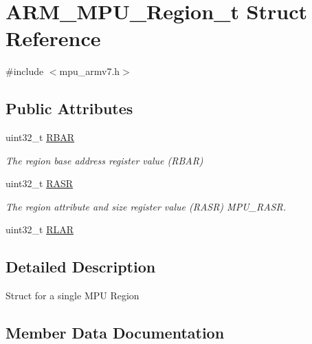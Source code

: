 \hypertarget{struct_a_r_m___m_p_u___region__t}{}\section{A\+R\+M\+\_\+\+M\+P\+U\+\_\+\+Region\+\_\+t Struct Reference}
\label{struct_a_r_m___m_p_u___region__t}


{\ttfamily \#include $<$mpu\+\_\+armv7.\+h$>$}

\subsection*{Public Attributes}
\begin{DoxyCompactItemize}
\item 
uint32\+\_\+t \mbox{\hyperlink{struct_a_r_m___m_p_u___region__t_afe7a7721aa08988d915670efa432cdd2}{R\+B\+AR}}
\begin{DoxyCompactList}\small\item\em The region base address register value (R\+B\+AR) \end{DoxyCompactList}\item 
\mbox{\label{struct_a_r_m___m_p_u___region__t_a38c1d3bc6a9ffc9423d633add01928f1}} 
uint32\+\_\+t \mbox{\hyperlink{struct_a_r_m___m_p_u___region__t_a38c1d3bc6a9ffc9423d633add01928f1}{R\+A\+SR}}
\begin{DoxyCompactList}\small\item\em The region attribute and size register value (R\+A\+SR) M\+P\+U\+\_\+\+R\+A\+SR. \end{DoxyCompactList}\item 
uint32\+\_\+t \mbox{\hyperlink{struct_a_r_m___m_p_u___region__t_ab5d3a650dbffd0b272bf7df5b140e8a8}{R\+L\+AR}}
\end{DoxyCompactItemize}


\subsection{Detailed Description}
Struct for a single M\+PU Region 

\subsection{Member Data Documentation}
\mbox{\label{struct_a_r_m___m_p_u___region__t_afe7a7721aa08988d915670efa432cdd2}} 
